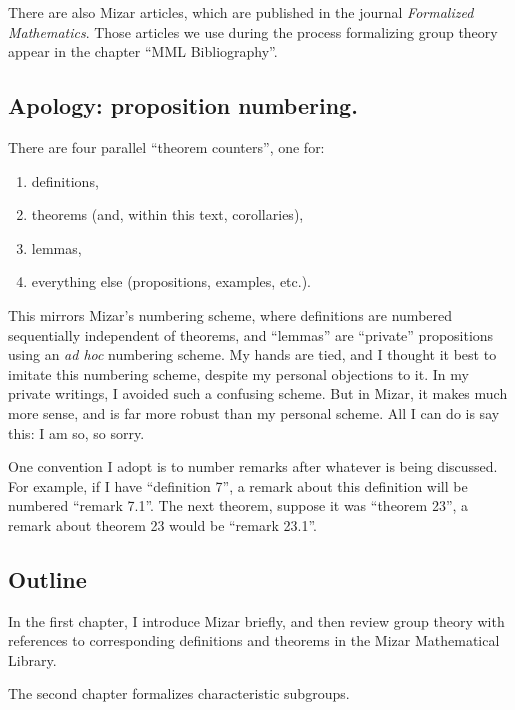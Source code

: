 There are also Mizar articles, which are published in the
journal \emph{Formalized Mathematics}. Those articles we use during the
process formalizing group theory appear in the chapter ``MML Bibliography''.

\subsection*{Apology: proposition numbering.} There are four parallel
``theorem counters'', one for:
\begin{enumerate}
\item definitions,
\item theorems (and, within this text, corollaries),
\item lemmas,
\item everything else (propositions, examples, etc.).
\end{enumerate}
This mirrors Mizar's numbering scheme, where definitions are numbered
sequentially independent of theorems, and ``lemmas'' are ``private''
propositions using an \emph{ad hoc} numbering scheme. My hands are tied,
and I thought it best to imitate this numbering scheme, despite my
personal objections to it. In my private writings, I avoided such a
confusing scheme. But in Mizar, it makes much more sense, and is far
more robust than my personal scheme. All I can do is say this: I am so,
so sorry.

One convention I adopt is to number remarks after whatever is being
discussed. For example, if I have ``definition 7'', a remark about this
definition will be numbered ``remark 7.1''. The next theorem, suppose it
was ``theorem 23'', a remark about theorem 23 would be ``remark 23.1''.

\subsection*{Outline} 
In the first chapter, I introduce Mizar briefly, and then review group
theory with references to corresponding definitions and theorems in the
Mizar Mathematical Library.

The second chapter formalizes characteristic subgroups.


